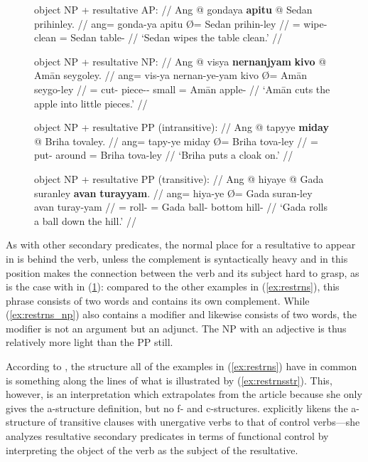 \begin{figure}
\pex\label{ex:restrns}
\a\label{ex:restrns_ap}%
	\begingl
		\glpreamble object NP + resultative AP: //
		\gla Ang @ gondaya \textbf{apitu} {} @ Sedan prihinley. //
		\glb ang= gonda-ya apitu Ø= Sedan prihin-ley //
		\glc \AgtT{}= wipe-\TsgM{} clean \Top{}= Sedan table-\PargI{} //
		\glft `Sedan wipes the table clean.' //
	\endgl

\a\label{ex:restrns_np}%
	\begingl
		\glpreamble object NP + resultative NP: //
		\gla Ang @ visya \textbf{nernanjyam} \textbf{kivo} {} @ Amān
			seygoley. //
		\glb ang= vis-ya nernan-ye-yam kivo Ø= Amān seygo-ley //
		\glc \AgtT{}= cut-\TsgM{} piece-\Pl{}-\Dat{} small \Top{}= Amān 
			apple-\PargI{} //
		\glft `Amān cuts the apple into little pieces.' //
	\endgl

\a\label{ex:restrns_pp1}%
	\begingl
		\glpreamble object NP + resultative PP (intransitive): //
		\gla Ang @ tapyye \textbf{miday} {} @ Briha tovaley. //
		\glb ang= tapy-ye miday Ø= Briha tova-ley //
		\glc \AgtT{}= put-\TsgF{} around \Top{}= Briha tova-ley //
		\glft `Briha puts a cloak on.' //
	\endgl

\a\label{ex:restrns_pp2}%
	\begingl
		\glpreamble object NP + resultative PP (transitive): //
		\gla Ang @ hiyaye {} @ Gada suranley \textbf{avan} 
			\textbf{turayyam}. //
		\glb ang= hiya-ye Ø= Gada suran-ley avan turay-yam //
		\glc \AgtT{}= roll-\TsgF{} \Top{}= Gada ball-\PargI{} bottom
			hill-\Dat{} //
		\glft `Gada rolls a ball down the hill.' //
	\endgl

\xe
\end{figure}

As with other secondary predicates, the normal place for a resultative to appear
in is behind the verb, unless the complement is syntactically heavy and in this
position makes the connection between the verb and its subject hard to grasp,
as is the case with  in
(\ref{ex:restrns_pp2}): compared to the other examples in (\ref{ex:restrns}),
this phrase consists of two words and contains its own complement. While
(\ref{ex:restrns_np}) also contains a modifier and likewise consists of two
words, the modifier is not an argument but an adjunct. The NP with an adjective
is thus relatively more light than the PP still.

According to \citet{simpson1983}, the structure all of the examples in
(\ref{ex:restrns}) have in common is something along the lines of what is
illustrated by (\ref{ex:restrnsstr}). This, however, is an interpretation which
extrapolates from the article because she only gives the a-structure
definition, but no f- and c-structures. \citet{simpson1983} explicitly likens
the a-structure of transitive clauses with unergative verbs to that of
control verbs---she analyzes resultative secondary predicates in terms of
functional control by interpreting the object of the verb as the subject of the
resultative.

